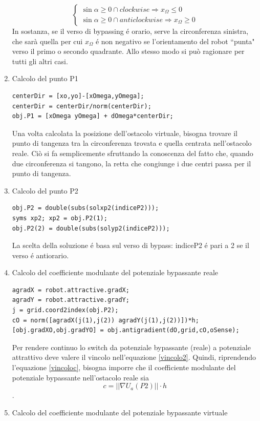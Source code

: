 \documentclass[14pt,a4paper]{extarticle}
\begin{document}
\begin{enumerate}
\[
\begin{cases}
\sin{\alpha} \geq 0 \cap clockwise \Rightarrow x_{\Omega} \leq 0 \\
\sin{\alpha} \geq 0 \cap anticlockwise \Rightarrow x_{\Omega} \geq 0
\end{cases}
\]
In sostanza, se il verso di bypassing é orario, serve la circonferenza sinistra, che sarà quella per cui \(x_{\Omega}\) é non negativo se l'orientamento del robot ``punta" verso il primo o secondo quadrante. Allo stesso modo si può ragionare per tutti gli altri casi.
\item Calcolo del punto P1
\begin{lstlisting}[caption=Istruzioni per calcolare P1]
centerDir = [xo,yo]-[xOmega,yOmega];
centerDir = centerDir/norm(centerDir);
obj.P1 = [xOmega yOmega] + dOmega*centerDir;
\end{lstlisting}
Una volta calcolata la posizione dell'ostacolo virtuale, bisogna trovare il punto di tangenza tra la circonferenza trovata e quella centrata nell'ostacolo reale. Ciò si fa semplicemente sfruttando la conoscenza del fatto che, quando due circonferenza si tangono, la retta che congiunge i due centri passa per il punto di tangenza.
\item Calcolo del punto P2
\begin{lstlisting}[caption=Istruzioni per calcolare P2]
obj.P2 = double(subs(solxp2(indiceP2)));
syms xp2; xp2 = obj.P2(1);
obj.P2(2) = double(subs(solyp2(indiceP2)));
\end{lstlisting}
La scelta della soluzione é basa sul verso di bypass: indiceP2 é pari a 2 se il verso é antiorario.
\item Calcolo del coefficiente modulante del potenziale bypassante reale
\begin{lstlisting}[caption=Istruzioni per calcolare il potenziale bypassante reale]
agradX = robot.attractive.gradX; 
agradY = robot.attractive.gradY;
j = grid.coord2index(obj.P2);
cO = norm([agradX(j(1),j(2)) agradY(j(1),j(2))])*h;
[obj.gradXO,obj.gradYO] = obj.antigradient(dO,grid,cO,oSense);
\end{lstlisting}
Per rendere continuo lo switch da potenziale bypassante (reale) a potenziale attrattivo deve valere il vincolo nell'equazione \ref{vincolo2}. Quindi, riprendendo l'equazione \ref{vincoloc}, bisogna imporre che il coefficiente modulante del potenziale bypassante nell'ostacolo reale sia \[c=||\nabla U_a(P2)||\cdot h\]. 
\item Calcolo del coefficiente modulante del potenziale bypassante virtuale

\end{enumerate}
\end{document}
